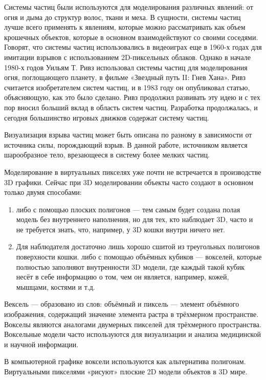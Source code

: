 \documentclass[a4paper,14pt]{article} %
\begin{document}
	Системы частиц были используются для моделирования различных явлений: от огня и дыма до структур волос, ткани и меха. В сущности, системы частиц лучше всего применять к явлениям, которые можно рассматривать как объем крошечных объектов, которые в основном взаимодействуют со своими соседями. Говорят, что системы частиц использовались в видеоиграх еще в 1960-х годах для имитации взрывов с использованием 2D-пиксельных облаков. Однако в начале 1980-х годов Уильям Т. Ривз использовал системы частиц для моделирования огня, поглощающего планету, в фильме «Звездный путь II: Гнев Хана». Ривз считается изобретателем систем частиц, и в 1983 году он опубликовал статью, объясняющую, как это было сделано. Ривз продолжил развивать эту идею и с тех пор вносил больший вклад в область систем частиц. Разработка продолжалась, и сегодня большинство игровых движков содержат систему частиц. 
	
	Визуализация взрыва частиц может быть описана по разному в зависимости от источника силы, порождающий взрыв. 
В данной работе, источником является шарообразное тело, врезающееся в систему более мелких частиц.
	
	Моделирование в виртуальных пикселях уже почти не встречается в производстве 3D графики. Сейчас при 3D моделировании объекты часто создают в основном только двумя способами:
	\begin{enumerate}
	\item либо с помощью плоских полигонов — тем самым будет создана полая модель без внутреннего наполнения, но для тех, кто наблюдает 3D, часто и не требуется знать, что, например, у 3D кошки внутри ничего нет. 
	\item Для наблюдателя достаточно лишь хорошо сшитой из треугольных полигонов поверхности кошки.
либо с помощью объёмных кубиков — вокселей, которые полностью заполняют внутренности 3D модели, где каждый такой кубик несёт в себе информацию о том, чем он является, например, кожей, мышцами, костями и т.д.
	\end{enumerate}

	Вексель — образовано из слов: объёмный и пиксель — элемент объёмного изображения, содержащий значение элемента растра в трёхмерном пространстве. Вокселы являются аналогами двумерных пикселей для трёхмерного пространства. Воксельные модели часто используются для визуализации и анализа медицинской и научной информации.
	
	В компьютерной графике воксели используются как альтернатива полигонам. Виртуальными пикселями «рисуют» плоские 2D модели объектов в 3D мире.
\end{document}
